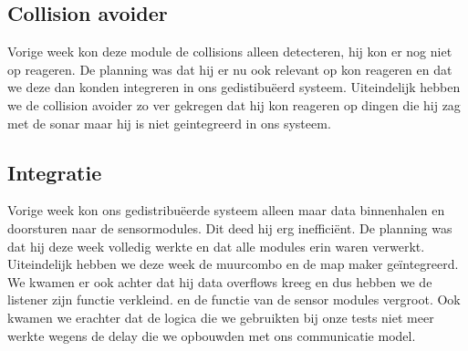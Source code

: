 \documentclass[a4paper,10pt]{article}
\begin{document}
\subsection{Collision avoider}
Vorige week kon deze module de collisions alleen detecteren, hij kon er nog niet op reageren. De planning was dat hij er nu ook relevant op kon reageren en dat we deze dan konden integreren in ons gedistibu\"eerd systeem. Uiteindelijk hebben we de collision avoider zo ver gekregen dat hij kon reageren op dingen die hij zag met de sonar maar hij is niet geintegreerd in ons systeem.

\subsection{Integratie}
Vorige week kon ons gedistribu\"eerde systeem alleen maar data binnenhalen en doorsturen naar de sensormodules. Dit deed hij erg ineffici\"ent. De planning was dat hij deze week volledig werkte en dat alle modules erin waren verwerkt. Uiteindelijk hebben we deze week de muurcombo en de map maker ge\"integreerd. We kwamen er ook achter dat hij data overflows kreeg en dus hebben we de listener zijn functie verkleind. en de functie van de sensor modules vergroot. Ook kwamen we erachter dat de logica die we gebruikten bij onze tests niet meer werkte wegens de delay die we opbouwden met ons communicatie model.
\end{document}
